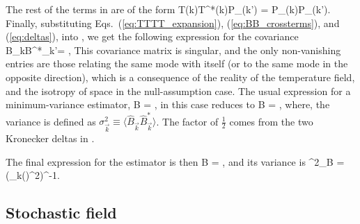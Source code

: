 The rest of the terms in \eq{\ref{eq:mean_BB}} are of the form
\beq
\bga
{}\langle T(\vec k)T^*(\vec k)\rangle P_(\vec k') =  P_(\vec k)P_(\vec k').
\ega
\label{eq:BB_crossterms}
\eeq
Finally, substituting Eqs.~(\ref{eq:TTTT_expansion}), (\ref{eq:BB_crossterms}), and (\ref{eq:deltas}), into \eq{\ref{eq:mean_BB}}, we get the following expression for the covariance
\beq
\langle \widehat B_{\vec k}\widehat B^*_{\vec k'}\rangle = ,
\label{eq:B_covariance}
\eeq
This covariance matrix is singular, and the only non-vanishing entries are those relating the same mode with itself (or to the same mode in the opposite direction), which is a consequence of the reality of the temperature field, and the isotropy of space in the null-assumption case. The usual expression for a minimum-variance estimator,
\beq
\widehat B = ,
\label{eq:B_mve}
\eeq
in this case reduces to 
\beq
\bga
\widehat B = ,
\ega
\label{eq:B_mve}
\eeq
where, the variance is defined as $\sigma^2_{\vec k}\equiv\langle \widehat B_{\vec k}\widehat B^*_{\vec k}\rangle $. The factor of $\frac{1}{2}$ comes from the two Kronecker deltas in \eq{\ref{eq:B_covariance}}. 

The final expression for the estimator is then
\beq
\bga
\widehat B = ,
\ega
\label{eq:B_estimator}
\eeq
and its variance is
\beq
\bga
\sigma^2_{\widehat B} = \left(\sum_{\vec k}\left(\right)^{2}\right)^{-1}.
\ega
\label{eq:B_estimator_var}
\eeq

\subsection{Stochastic field}
\label{subsec:SI}

